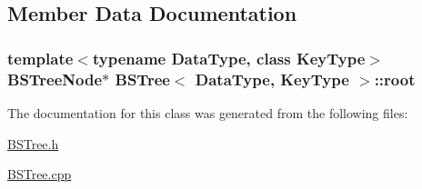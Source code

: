 \subsection{Member Data Documentation}
\subsubsection[{\texorpdfstring{root}{root}}]{\setlength{\rightskip}{0pt plus 5cm}template$<$typename Data\+Type, class Key\+Type$>$ {\bf B\+S\+Tree\+Node}$\ast$ {\bf B\+S\+Tree}$<$ Data\+Type, Key\+Type $>$\+::root\hspace{0.3cm}{\ttfamily [protected]}}\hypertarget{class_b_s_tree_a83534afce9094181ac031f9f596a8625}{}\label{class_b_s_tree_a83534afce9094181ac031f9f596a8625}


The documentation for this class was generated from the following files\+:\begin{DoxyCompactItemize}
\item 
\hyperlink{_b_s_tree_8h}{B\+S\+Tree.\+h}\item 
\hyperlink{_b_s_tree_8cpp}{B\+S\+Tree.\+cpp}\end{DoxyCompactItemize}

